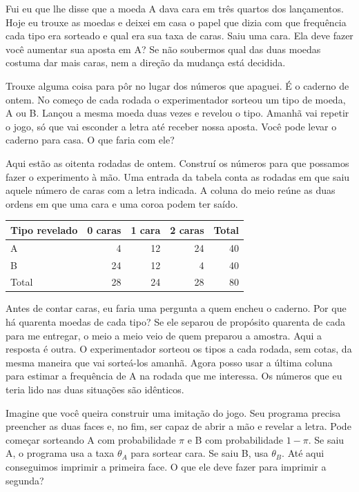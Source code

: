 Fui eu que lhe disse que a moeda A dava cara em três quartos dos lançamentos. Hoje eu trouxe as moedas e deixei em casa o papel que dizia com que frequência cada tipo era sorteado e qual era sua taxa de caras. Saiu uma cara. Ela deve fazer você aumentar sua aposta em A? Se não soubermos qual das duas moedas costuma dar mais caras, nem a direção da mudança está decidida.

Trouxe alguma coisa para pôr no lugar dos números que apaguei. É o caderno de ontem. No começo de cada rodada o experimentador sorteou um tipo de moeda, A ou B. Lançou a mesma moeda duas vezes e revelou o tipo. Amanhã vai repetir o jogo, só que vai esconder a letra até receber nossa aposta. Você pode levar o caderno para casa. O que faria com ele?

Aqui estão as oitenta rodadas de ontem. Construí os números para que possamos fazer o experimento à mão. Uma entrada da tabela conta as rodadas em que saiu aquele número de caras com a letra indicada. A coluna do meio reúne as duas ordens em que uma cara e uma coroa podem ter saído.
\begin{center}
\begin{tabular}{lrrrr}
\toprule
Tipo revelado & 0 caras & 1 cara & 2 caras & Total \\
\midrule
A & 4 & 12 & 24 & 40 \\
B & 24 & 12 & 4 & 40 \\
\midrule
Total & 28 & 24 & 28 & 80 \\
\bottomrule
\end{tabular}
\end{center}

Antes de contar caras, eu faria uma pergunta a quem encheu o caderno. Por que há quarenta moedas de cada tipo? Se ele separou de propósito quarenta de cada para me entregar, o meio a meio veio de quem preparou a amostra. Aqui a resposta é outra. O experimentador sorteou os tipos a cada rodada, sem cotas, da mesma maneira que vai sorteá-los amanhã. Agora posso usar a última coluna para estimar a frequência de A na rodada que me interessa. Os números que eu teria lido nas duas situações são idênticos.

Imagine que você queira construir uma imitação do jogo. Seu programa precisa preencher as duas faces e, no fim, ser capaz de abrir a mão e revelar a letra. Pode começar sorteando A com probabilidade $\pi$ e B com probabilidade $1-\pi$. Se saiu A, o programa usa a taxa $\theta_A$ para sortear cara. Se saiu B, usa $\theta_B$. Até aqui conseguimos imprimir a primeira face. O que ele deve fazer para imprimir a segunda?

